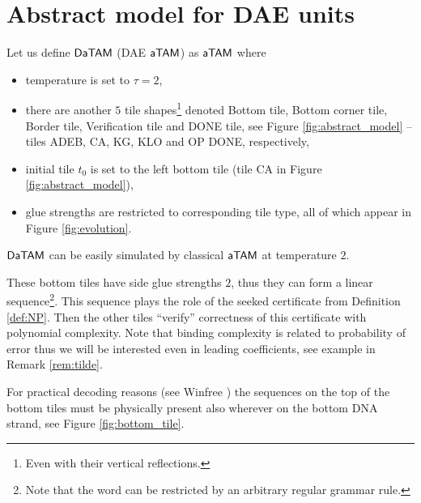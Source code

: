 \section{Abstract model for DAE units}

\begin{defn}
	Let us define $\mathsf{DaTAM}$ (DAE $\mathsf{aTAM}$) as $\mathsf{aTAM}$ where
	\begin{itemize}
		\item temperature is set to $\tau = 2$,
		\item there are another $5$ tile shapes\footnote{Even with their vertical reflections.} denoted Bottom tile, Bottom corner tile, Border tile, Verification tile and DONE tile, see Figure \ref{fig:abstract_model} -- tiles {\sf ADEB}, {\sf CA}, {\sf KG}, {\sf KLO} and {\sf OP DONE}, respectively,
		\item initial tile $t_0$ is set to the left bottom tile (tile {\sf CA} in Figure \ref{fig:abstract_model}),
		\item glue strengths are restricted to corresponding tile type, all of which appear in Figure \ref{fig:evolution}.
	\end{itemize}
\end{defn}

\begin{note}
	$\mathsf{DaTAM}$ can be easily simulated by classical $\mathsf{aTAM}$ at temperature $2$.   %
\end{note}

These bottom tiles have side glue strengths $2$, thus they can form a linear sequence\footnote{Note that the word can be restricted by an arbitrary regular grammar rule.}. This sequence plays the role of the seeked certificate from Definition \ref{def:NP}. Then the other tiles ``verify'' correctness of this certificate with polynomial complexity. Note that binding complexity is related to probability of error thus we will be interested even in leading coefficients, see example in Remark \ref{rem:tilde}.

For practical decoding reasons (see Winfree \cite{winfree_phd}) the sequences on the top of the bottom tiles must be physically present also wherever on the bottom DNA strand, see Figure \ref{fig:bottom_tile}.

